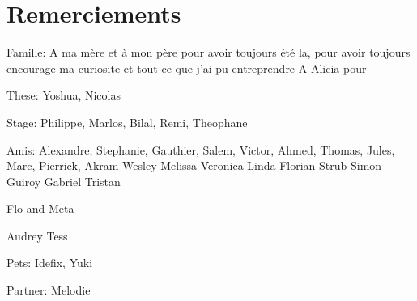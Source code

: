 \chapter*{Remerciements}


Famille: A ma m\`{e}re et \`{a} mon p\`{e}re pour avoir toujours \'{e}t\'{e} la, pour
avoir toujours encourage ma curiosite et tout ce que j'ai pu entreprendre
A Alicia pour

These: Yoshua, Nicolas

Stage: Philippe, Marlos, Bilal, Remi, Theophane

Amis: Alexandre, Stephanie, Gauthier, 
Salem, Victor, Ahmed, Thomas, Jules, Marc, Pierrick,
Akram
Wesley
Melissa
Veronica
Linda
Florian Strub
Simon Guiroy
Gabriel
Tristan

Flo and Meta

Audrey
Tess

Pets: Idefix, Yuki

Partner: Melodie
